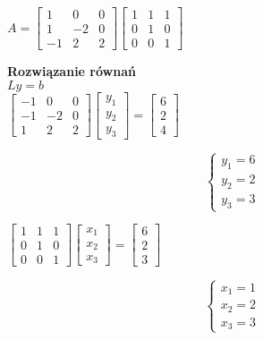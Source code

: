 \documentclass{article}
\begin{document}
$A=\begin{bmatrix} 1 & 0 & 0 \\ 1 & -2 & 0 \\ -1 & 2 & 2 \end{bmatrix}\begin{bmatrix} 1 & 1 & 1 \\ 0 & 1 & 0 \\ 0 & 0 & 1 \end{bmatrix}$

\textbf{Rozwiązanie równań}\\
$Ly=b$\\
$\begin{bmatrix} -1 & 0 & 0 \\ -1 & -2 & 0 \\ 1 & 2 & 2 \end{bmatrix}\begin{bmatrix} y_1 \\ y_2 \\ y_3 \end{bmatrix} = \begin{bmatrix} 6 \\ 2 \\ 4 \end{bmatrix}$

\begin{equation*}\begin{cases}
    y_1=6\\
    y_2=2\\
    y_3=3
\end{cases}\end{equation*}

$\begin{bmatrix} 1 & 1 & 1 \\ 0 & 1 & 0 \\ 0 & 0 & 1 \end{bmatrix}\begin{bmatrix} x_1 \\ x_2 \\ x_3 \end{bmatrix} = \begin{bmatrix} 6 \\ 2 \\ 3 \end{bmatrix}$

\begin{equation*}\begin{cases}
    x_1=1\\
    x_2=2\\
    x_3=3
\end{cases}\end{equation*}
\end{document}
